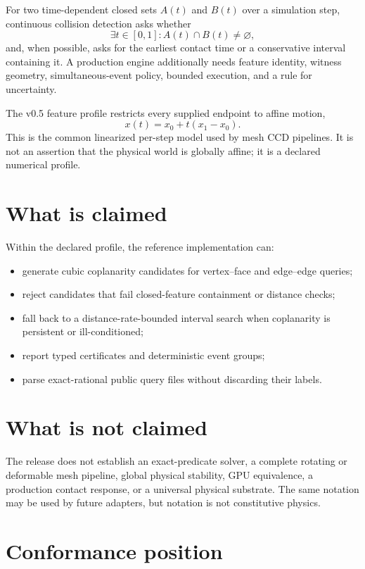 \documentclass[11pt,a4paper,oneside]{book}
\begin{document}
For two time-dependent closed sets $A(t)$ and $B(t)$ over a simulation step, continuous collision detection asks whether
\[
  \exists t\in[0,1] : A(t)\cap B(t)\neq\varnothing,
\]
and, when possible, asks for the earliest contact time or a conservative interval containing it. A production engine additionally needs feature identity, witness geometry, simultaneous-event policy, bounded execution, and a rule for uncertainty.

The v0.5 feature profile restricts every supplied endpoint to affine motion,
\[
  x(t)=x_0+t(x_1-x_0).
\]
This is the common linearized per-step model used by mesh CCD pipelines. It is not an assertion that the physical world is globally affine; it is a declared numerical profile.

\section{What is claimed}

Within the declared profile, the reference implementation can:
\begin{itemize}
  \item generate cubic coplanarity candidates for vertex--face and edge--edge queries;
  \item reject candidates that fail closed-feature containment or distance checks;
  \item fall back to a distance-rate-bounded interval search when coplanarity is persistent or ill-conditioned;
  \item report typed certificates and deterministic event groups;
  \item parse exact-rational public query files without discarding their labels.
\end{itemize}

\section{What is not claimed}

The release does not establish an exact-predicate solver, a complete rotating or deformable mesh pipeline, global physical stability, GPU equivalence, a production contact response, or a universal physical substrate. The same notation may be used by future adapters, but notation is not constitutive physics.

\section{Conformance position}
\end{document}
